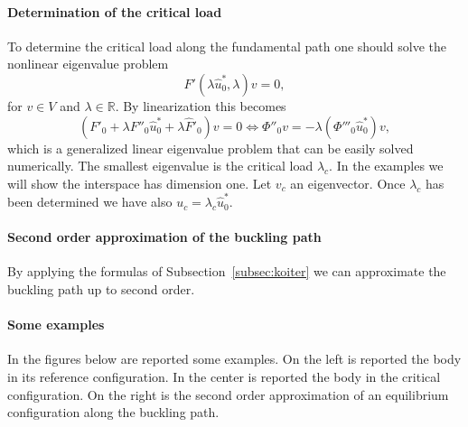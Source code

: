 \documentclass[a4paper,11pt]{article}
\theoremstyle{definition}
\begin{document}
\paragraph{Determination of the critical load} To determine the critical load along the fundamental path one should solve the nonlinear eigenvalue problem
\[
F'(\lambda\hat u^*_0,\lambda)v=0,
\]
for $v\in V$ and $\lambda\in\mathbb{R}$. By linearization this becomes
\[
(F'_0+\lambda F''_0\hat u^*_0+\lambda\hat F'_0)v=0\iff\Phi''_0v=-\lambda(\Phi'''_0\hat u^*_0)v,
\]
which is a generalized linear eigenvalue problem that can be easily solved numerically. The smallest eigenvalue is the critical load $\lambda_c$. In the examples we will show the interspace has dimension one. Let $v_c$ an eigenvector. Once $\lambda_c$ has been determined we have also $u_c=\lambda_c\hat u^*_0$.

\paragraph{Second order approximation of the buckling path} By applying the formulas of Subsection~\ref{subsec:koiter} we can approximate the buckling path up to second order.

\paragraph{Some examples} In the figures below are reported some examples. On the left is reported the body in its reference configuration. In the center is reported the body in the critical configuration. On the right is the second order approximation of an equilibrium configuration along the buckling path.
\end{document}

